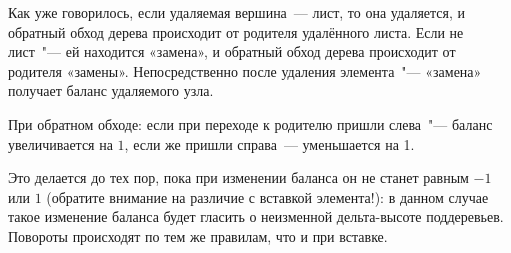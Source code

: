 Как уже говорилось, если удаляемая вершина — лист, то она удаляется,
и обратный обход дерева происходит от родителя удалённого листа.
Если не лист "--- ей находится «замена», и обратный обход дерева происходит от родителя «замены».
Непосредственно после удаления элемента "--- «замена» получает баланс удаляемого узла.

При обратном обходе: если при переходе к родителю пришли слева "--- баланс увеличивается на $1$,
если же пришли справа — уменьшается на 1.

Это делается до тех пор, пока при изменении баланса он не станет равным $-1$ или $1$
(обратите внимание на различие с вставкой элемента!):
в данном случае такое изменение баланса будет гласить о неизменной дельта-высоте поддеревьев.
Повороты происходят по тем же правилам, что и при вставке.